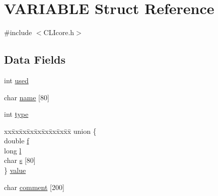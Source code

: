 \hypertarget{structVARIABLE}{\section{V\+A\+R\+I\+A\+B\+L\+E Struct Reference}
\label{structVARIABLE}
}


{\ttfamily \#include $<$C\+L\+Icore.\+h$>$}

\subsection*{Data Fields}
\begin{DoxyCompactItemize}
\item 
int \hyperlink{structVARIABLE_a33fcb1d4034cdf238453dc4ac3f17290}{used}
\item 
char \hyperlink{structVARIABLE_a40d583ae511f61e22f3ade6f130a7d58}{name} \mbox{[}80\mbox{]}
\item 
int \hyperlink{structVARIABLE_a84814331e54156c3ac9fbe6d2b851daf}{type}
\item 
\begin{tabbing}
xx\=xx\=xx\=xx\=xx\=xx\=xx\=xx\=xx\=\kill
union \{\\
\>double \hyperlink{structVARIABLE_af31bb248155770bb6d7080aa50bdb4fd}{f}\\
\>long \hyperlink{structVARIABLE_ab47a102e3cd7c7085641ffc056c41878}{l}\\
\>char \hyperlink{structVARIABLE_a63e49f4cf699d62212a55d257d0d87f7}{s} \mbox{[}80\mbox{]}\\
\} \hyperlink{structVARIABLE_ac78c074d5d0c437357a205d97ee58c70}{value}\\

\end{tabbing}\item 
char \hyperlink{structVARIABLE_a681a0cb52e89855a9cf7f1bd908ba6ee}{comment} \mbox{[}200\mbox{]}
\end{DoxyCompactItemize}


